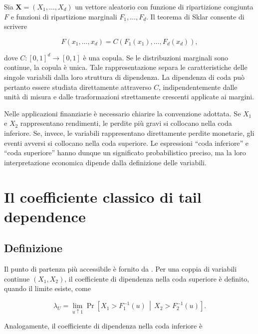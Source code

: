 Sia $\mathbf{X}=(X_1,\ldots,X_d)$ un vettore aleatorio con funzione di
ripartizione congiunta $F$ e funzioni di ripartizione marginali
$F_1,\ldots,F_d$. Il teorema di Sklar consente di scrivere

\begin{equation}
    F(x_1,\ldots,x_d)
    = C\!\left(F_1(x_1),\ldots,F_d(x_d)\right),
    \label{eq:sklar}
\end{equation}

dove $C\colon[0,1]^d\to[0,1]$ è una copula. Se le distribuzioni marginali
sono continue, la copula è unica. Tale rappresentazione separa le
caratteristiche delle singole variabili dalla loro struttura di dipendenza.
La dipendenza di coda può pertanto essere studiata direttamente attraverso
$C$, indipendentemente dalle unità di misura e dalle trasformazioni
strettamente crescenti applicate ai margini.

Nelle applicazioni finanziarie è necessario chiarire la convenzione adottata.
Se $X_1$ e $X_2$ rappresentano rendimenti, le perdite più gravi si collocano
nella coda inferiore. Se, invece, le variabili rappresentano direttamente
perdite monetarie, gli eventi avversi si collocano nella coda superiore. Le
espressioni ``coda inferiore'' e ``coda superiore'' hanno dunque un significato
probabilistico preciso, ma la loro interpretazione economica dipende dalla
definizione delle variabili.

\section{Il coefficiente classico di tail dependence}

\subsection{Definizione}

Il punto di partenza più accessibile è fornito da \textcite{schmidt2005}. Per
una coppia di variabili continue $(X_1,X_2)$, il coefficiente di dipendenza
nella coda superiore è definito, quando il limite esiste, come

\begin{equation}
    \lambda_U
    = \lim_{u\uparrow 1}
    \Pr\!\left[
        X_1>F_1^{-1}(u)
        \,\middle|\,
        X_2>F_2^{-1}(u)
    \right].
    \label{eq:lambda-upper-def}
\end{equation}

Analogamente, il coefficiente di dipendenza nella coda inferiore è

